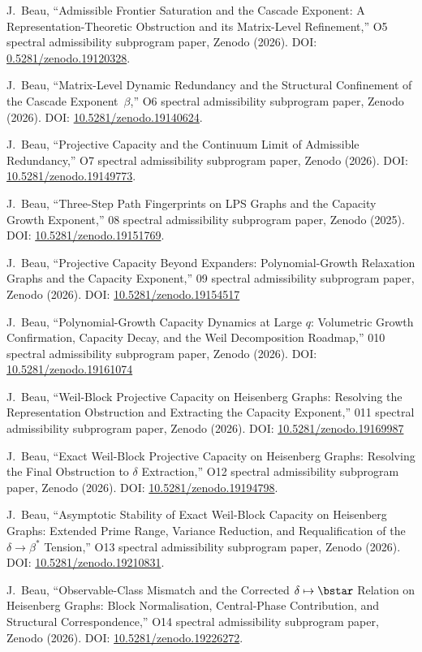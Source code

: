 J.~Beau,
``Admissible Frontier Saturation and the Cascade Exponent: A Representation-Theoretic Obstruction and its Matrix-Level
Refinement,''
O5 spectral admissibility subprogram paper, Zenodo (2026).
DOI: \href{https://doi.org/10.5281/zenodo.19120328}{0.5281/zenodo.19120328}.

J.~Beau,
``Matrix-Level Dynamic Redundancy and the Structural Confinement of the Cascade Exponent~$\beta$,''
O6 spectral admissibility subprogram paper, Zenodo (2026).
DOI: \href{https://doi.org/10.5281/zenodo.19140624}{10.5281/zenodo.19140624}.

J.~Beau,
``Projective Capacity and the Continuum Limit of Admissible Redundancy,''
O7 spectral admissibility subprogram paper, Zenodo (2026).
DOI: \href{https://doi.org/10.5281/zenodo.19149773}{10.5281/zenodo.19149773}.

J.~Beau,
``Three-Step Path Fingerprints on LPS Graphs and the Capacity Growth Exponent,''
08 spectral admissibility subprogram paper, Zenodo (2025).
DOI: \href{https://doi.org/10.5281/zenodo.19151769}{10.5281/zenodo.19151769}.

J.~Beau,
``Projective Capacity Beyond Expanders: Polynomial-Growth Relaxation Graphs and the Capacity Exponent,''
09 spectral admissibility subprogram paper, Zenodo (2026).
DOI: \href{https://doi.org/10.5281/zenodo.19154517}{10.5281/zenodo.19154517}

J.~Beau,
``Polynomial-Growth Capacity Dynamics at Large $q$: Volumetric Growth Confirmation, Capacity Decay, and the Weil
Decomposition Roadmap,''
010 spectral admissibility subprogram paper, Zenodo (2026).
DOI: \href{https://doi.org/10.5281/zenodo.19161074}{10.5281/zenodo.19161074}

J.~Beau,
``Weil-Block Projective Capacity on Heisenberg Graphs: Resolving the Representation Obstruction and Extracting the
Capacity Exponent,''
011 spectral admissibility subprogram paper, Zenodo (2026).
DOI: \href{https://doi.org/10.5281/zenodo.19169987}{10.5281/zenodo.19169987}

J.~Beau,
``Exact Weil-Block Projective Capacity on Heisenberg Graphs: Resolving the Final Obstruction to $\delta$ Extraction,''
O12 spectral admissibility subprogram paper, Zenodo (2026).
DOI: \href{https://doi.org/10.5281/zenodo.19194798}{10.5281/zenodo.19194798}.

J.~Beau,
``Asymptotic Stability of Exact Weil-Block Capacity on Heisenberg Graphs: Extended Prime Range, Variance Reduction,
and Requalification of the \(\delta \to \beta^*\) Tension,''
O13 spectral admissibility subprogram paper, Zenodo (2026).
DOI: \href{https://doi.org/10.5281/zenodo.19210831}{10.5281/zenodo.19210831}.

J.~Beau,
``Observable-Class Mismatch and the Corrected $\delta \mapsto \bstar$ Relation on Heisenberg Graphs:
Block Normalisation, Central-Phase Contribution,
and Structural Correspondence,''
O14 spectral admissibility subprogram paper, Zenodo (2026).
DOI: \href{https://doi.org/10.5281/zenodo.19226272}{10.5281/zenodo.19226272}.
